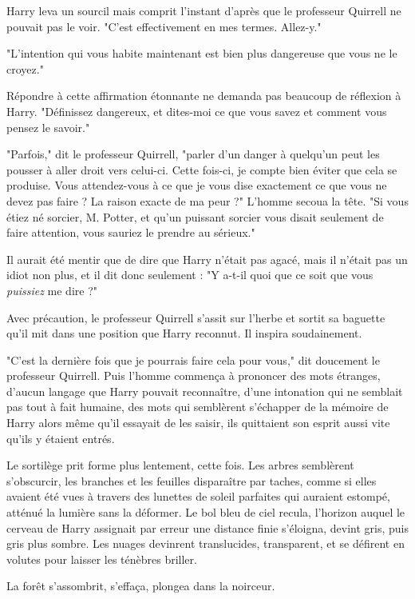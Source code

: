 Harry leva un sourcil mais comprit l'instant d'après que le professeur Quirrell ne pouvait pas le voir. "C'est effectivement en mes termes. Allez-y."

"L'intention qui vous habite maintenant est bien plus dangereuse que vous ne le croyez."

Répondre à cette affirmation étonnante ne demanda pas beaucoup de réflexion à Harry. "Définissez dangereux, et dites-moi ce que vous savez et comment vous pensez le savoir."

"Parfois," dit le professeur Quirrell, "parler d'un danger à quelqu'un peut les pousser à aller droit vers celui-ci. Cette fois-ci, je compte bien éviter que cela se produise. Vous attendez-vous à ce que je vous dise exactement ce que vous ne devez pas faire ? La raison exacte de ma peur ?" L'homme secoua la tête. "Si vous étiez né sorcier, M. Potter, et qu'un puissant sorcier vous disait seulement de faire attention, vous sauriez le prendre au sérieux."

Il aurait été mentir que de dire que Harry n'était pas agacé, mais il n'était pas un idiot non plus, et il dit donc seulement : "Y a-t-il quoi que ce soit que vous \emph{puissiez}  me dire ?"

Avec précaution, le professeur Quirrell s'assit sur l'herbe et sortit sa baguette qu'il mit dans une position que Harry reconnut. Il inspira soudainement.

"C'est la dernière fois que je pourrais faire cela pour vous," dit doucement le professeur Quirrell. Puis l'homme commença à prononcer des mots étranges, d'aucun langage que Harry pouvait reconnaître, d'une intonation qui ne semblait pas tout à fait humaine, des mots qui semblèrent s'échapper de la mémoire de Harry alors même qu'il essayait de les saisir, ils quittaient son esprit aussi vite qu'ils y étaient entrés.

Le sortilège prit forme plus lentement, cette fois. Les arbres semblèrent s'obscurcir, les branches et les feuilles disparaître par taches, comme si elles avaient été vues à travers des lunettes de soleil parfaites qui auraient estompé, atténué la lumière sans la déformer. Le bol bleu de ciel recula, l'horizon auquel le cerveau de Harry assignait par erreur une distance finie s'éloigna, devint gris, puis gris plus sombre. Les nuages devinrent translucides, transparent, et se défirent en volutes pour laisser les ténèbres briller.

La forêt s'assombrit, s'effaça, plongea dans la noirceur.

